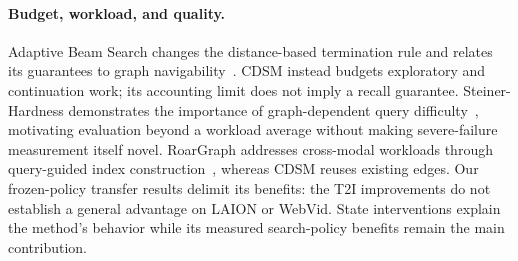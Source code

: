 \paragraph{Budget, workload, and quality.}
Adaptive Beam Search changes the distance-based termination rule and relates its guarantees to graph navigability~\cite{abs}. CDSM instead budgets exploratory and continuation work; its accounting limit does not imply a recall guarantee. Steiner-Hardness demonstrates the importance of graph-dependent query difficulty~\cite{steiner}, motivating evaluation beyond a workload average without making severe-failure measurement itself novel. RoarGraph addresses cross-modal workloads through query-guided index construction~\cite{roargraph}, whereas CDSM reuses existing edges. Our frozen-policy transfer results delimit its benefits: the T2I improvements do not establish a general advantage on LAION or WebVid. State interventions explain the method's behavior while its measured search-policy benefits remain the main contribution.
